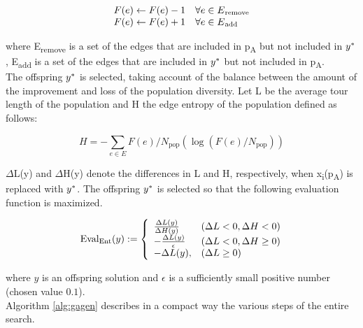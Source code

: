 \begin{equation}\begin{array}{ll}
F(e) \leftarrow F(e)-1 & \forall e \in E\textsubscript{remove} \\
F(e) \leftarrow F(e)+1 & \forall e \in E\textsubscript{add}
\end{array}\end{equation}

where E\textsubscript{remove} is a set of the edges that are included in p\textsubscript{A} but not included in $y\ssymbol{1}$, E\textsubscript{add} is a set of the edges that are included in $y\ssymbol{1}$ but not included in p\textsubscript{A}. \\

The offspring $y\ssymbol{1}$ is selected, taking account of the balance between the amount of the improvement and loss of the population diversity. Let L be the average tour length of the population and H the edge entropy of the population defined as follows:

\begin{equation}
H=-\sum_{e \in E} F(e) / N_{\mathrm{pop}}\left(\log \left(F(e) / N_{\mathrm{pop}}\right)\right)
\end{equation}

$\Delta$L(y) and $\Delta$H(y) denote the differences in L and H, respectively, when x\textsubscript{i}(p\textsubscript{A}) is replaced with $y\ssymbol{1}$. The offspring $y\ssymbol{1}$ is selected so that the following evaluation function is maximized.

\begin{equation}\text { Eval\textsubscript{Ent}}(y):=\left\{\begin{array}{ll}
\frac{\Delta L(y)}{\Delta H(y)} & (\Delta L<0, \Delta H<0) \\
-\frac{\Delta L(y)}{\epsilon} & (\Delta L<0, \Delta H \geq 0) \\
-\Delta L(y), & (\Delta L \geq 0)
\end{array}\right.\end{equation}

where $y$ is an offspring solution and $\epsilon$ is a sufficiently small positive number (chosen value $0.1$).\\
Algorithm \ref{alg:gagen} describes in a compact way the various steps of the entire search.

